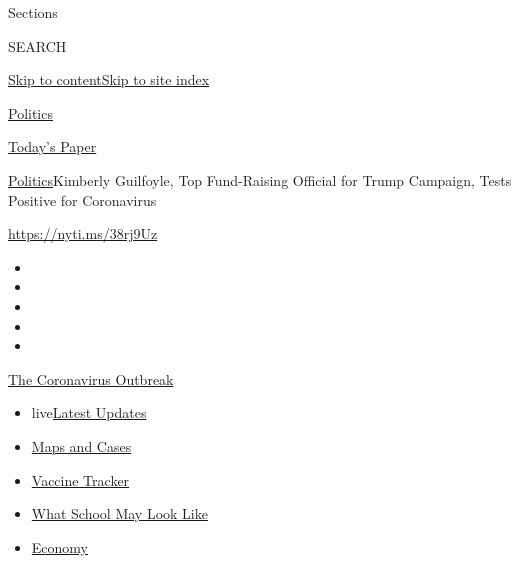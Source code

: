 Sections

SEARCH

\protect\hyperlink{site-content}{Skip to
content}\protect\hyperlink{site-index}{Skip to site index}

\href{https://www.nytimes.com/section/politics}{Politics}

\href{https://myaccount.nytimes.com/auth/login?response_type=cookie\&client_id=vi}{}

\href{https://www.nytimes.com/section/todayspaper}{Today's Paper}

\href{/section/politics}{Politics}\textbar{}Kimberly Guilfoyle, Top
Fund-Raising Official for Trump Campaign, Tests Positive for Coronavirus

\url{https://nyti.ms/38rj9Uz}

\begin{itemize}
\item
\item
\item
\item
\item
\end{itemize}

\href{https://www.nytimes.com/news-event/coronavirus?action=click\&pgtype=Article\&state=default\&region=TOP_BANNER\&context=storylines_menu}{The
Coronavirus Outbreak}

\begin{itemize}
\tightlist
\item
  live\href{https://www.nytimes.com/2020/08/01/world/coronavirus-covid-19.html?action=click\&pgtype=Article\&state=default\&region=TOP_BANNER\&context=storylines_menu}{Latest
  Updates}
\item
  \href{https://www.nytimes.com/interactive/2020/us/coronavirus-us-cases.html?action=click\&pgtype=Article\&state=default\&region=TOP_BANNER\&context=storylines_menu}{Maps
  and Cases}
\item
  \href{https://www.nytimes.com/interactive/2020/science/coronavirus-vaccine-tracker.html?action=click\&pgtype=Article\&state=default\&region=TOP_BANNER\&context=storylines_menu}{Vaccine
  Tracker}
\item
  \href{https://www.nytimes.com/interactive/2020/07/29/us/schools-reopening-coronavirus.html?action=click\&pgtype=Article\&state=default\&region=TOP_BANNER\&context=storylines_menu}{What
  School May Look Like}
\item
  \href{https://www.nytimes.com/live/2020/07/31/business/stock-market-today-coronavirus?action=click\&pgtype=Article\&state=default\&region=TOP_BANNER\&context=storylines_menu}{Economy}
\end{itemize}

